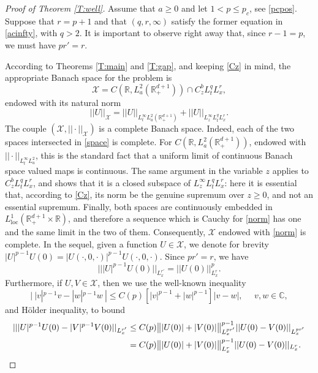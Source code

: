 \documentclass[10pt,a4paper]{amsart}
\newcommand{\C}{\mathbb{C}}
\def \R {\mathbb{R}}
\def \RN {\mathbb{R}_+^{d+1}}
\newcommand{\Xs}{\mathcal X}
\begin{document}
\begin{proof}[Proof of Theorem \ref{T:well}]
Assume that $a\ge 0$ and let $1<p\le p_c$, see \eqref{pcpos}. Suppose that $r = p+1$ and that $(q,r,\infty)$ satisfy the former equation in \eqref{acinfty}, with $q>2$. It is important to observe right away that, since $r-1 = p$, we must have $p r' = r$.

According to Theorems \ref{T:main} and \ref{T:gap}, and keeping \eqref{Cz} in mind, the appropriate Banach space for the problem is 
\begin{equation}\label{space}
\mathcal X= C(\R,L^2_a(\RN)) \cap C^{b}_z L^q_t L^r_x ,
\end{equation}
endowed with its natural norm 
\begin{equation}\label{norm}
||U||_{\Xs}= ||U||_{L^\infty_t L^2_a(\RN)} + ||U||_{L^\infty_z L^q_tL^r_x }.
\end{equation}
The couple $(\Xs,||\cdot||_{\Xs})$ is a complete Banach space. Indeed, each of the two spaces intersected in \eqref{space} is complete. For $C(\R,L^2_a(\RN))$, endowed with $||\cdot||_{L^\infty_t L^2_a}$, this is the standard fact that a uniform limit of continuous Banach space valued maps is continuous. The same argument in the variable $z$ applies to $C^b_z L^q_t L^r_x$, and shows that it is a closed subspace of $L^\infty_z L^q_t L^r_x$: here it is essential that, according to \eqref{Cz}, its norm be the genuine supremum over $z\ge 0$, and not an essential supremum. Finally, both spaces are continuously embedded in $L^1_{\operatorname{loc}}(\RN\times \R)$, and therefore a sequence which is Cauchy for \eqref{norm} has one and the same limit in the two of them. Consequently, $\Xs$ endowed with \eqref{norm} is complete.
In the sequel, given a function $U\in \Xs$, we denote for brevity  $|U|^{p-1} U(0) = |U(\cdot,0,\cdot)|^{p-1} U(\cdot,0,\cdot)$. Since $pr' = r$, we have
\begin{equation}\label{UU}
|||U|^{p-1} U(0)||_{L^{r'}_x} = ||U(0)||_{L^r_x}^p.
\end{equation}
Furthermore, if $U, V\in \Xs$, then we use the well-known inequality
\[
|\ |v|^{p-1} v - |w|^{p-1} w\ |\le C(p) \left[|v|^{p-1} + |w|^{p-1}\right] |v - w|,\ \ \ \ \ \ v, w\in \C,
\]
and H\"older inequality, to bound
\begin{align}\label{UUU}
|| |U|^{p-1} U(0) - |V|^{p-1} V(0)||_{L^{r'}_x} & \le C(p) \big\||U(0)| + |V(0)|\big\|^{p-1}_{L^{pr'}_x} ||U(0)-V(0)||_{L^{pr'}_x}
\\
& = C(p) \big\||U(0)| + |V(0)|\big\|^{p-1}_{L^{r}_x}  ||U(0)-V(0)||_{L^{r}_x}.
\notag
\end{align} 
 




\end{proof}
\end{document}

